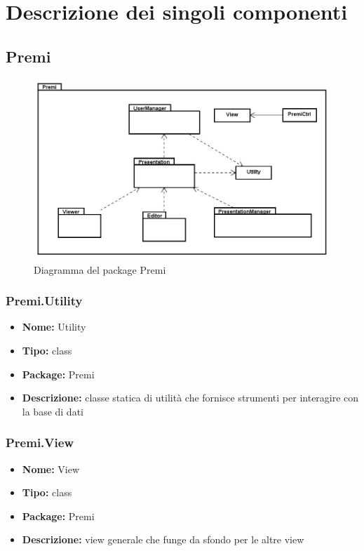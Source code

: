 \section{Descrizione dei singoli componenti}
\subsection{Premi}
\begin{figure}[h]
\begin{center}
\includegraphics[scale=0.45]{img/diapkg/premi-class.jpg}
\caption{Diagramma del package Premi}
\end{center}
\end{figure}


\subsubsection{Premi.Utility}
\begin{itemize}
  \item[] \textbf{Nome:} Utility
  \item[] \textbf{Tipo:} class
  \item[] \textbf{Package:} Premi
  \item[] \textbf{Descrizione:} classe statica di utilità che fornisce strumenti per interagire con la base di dati
\end{itemize}

\subsubsection{Premi.View}
\begin{itemize}
  \item \textbf{Nome:} View
  \item \textbf{Tipo:} class
  \item \textbf{Package:} Premi
  \item \textbf{Descrizione:} view generale che funge da sfondo per le altre view
\end{itemize}

